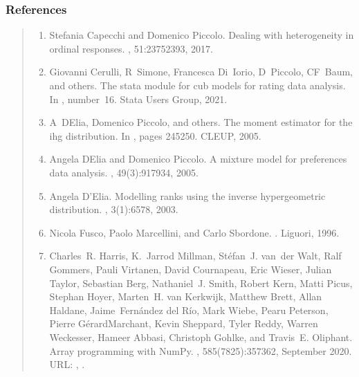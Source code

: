 \documentclass[letterpaper,10pt,english]{sphinxmanual}
\begin{document}
\subsubsection{References}
\label{\detokenize{cubmods:references}}\begin{quote}
\begin{enumerate}
%
\setcounter{enumi}{0}
\item {} 
\sphinxAtStartPar
Stefania Capecchi and Domenico Piccolo. Dealing with heterogeneity in ordinal responses. , 51:2375\textendash{}2393, 2017.

\item {} 
\sphinxAtStartPar
Giovanni Cerulli, R Simone, Francesca Di Iorio, D Piccolo, CF Baum, and others. The stata module for cub models for rating data analysis. In , number 16. Stata Users Group, 2021.

\item {} 
\sphinxAtStartPar
A D\textquotesingle{}Elia, Domenico Piccolo, and others. The moment estimator for the ihg distribution. In , pages 245\textendash{}250. CLEUP, 2005.

\item {} 
\sphinxAtStartPar
Angela D\textquotesingle{}Elia and Domenico Piccolo. A mixture model for preferences data analysis. , 49(3):917\textendash{}934, 2005.

\item {} 
\sphinxAtStartPar
Angela D’Elia. Modelling ranks using the inverse hypergeometric distribution. , 3(1):65\textendash{}78, 2003.

\item {} 
\sphinxAtStartPar
Nicola Fusco, Paolo Marcellini, and Carlo Sbordone. . Liguori, 1996.

\item {} 
\sphinxAtStartPar
Charles R. Harris, K. Jarrod Millman, Stéfan J. van der Walt, Ralf Gommers, Pauli Virtanen, David Cournapeau, Eric Wieser, Julian Taylor, Sebastian Berg, Nathaniel J. Smith, Robert Kern, Matti Picus, Stephan Hoyer, Marten H. van Kerkwijk, Matthew Brett, Allan Haldane, Jaime Fernández del Río, Mark Wiebe, Pearu Peterson, Pierre Gérard\sphinxhyphen{}Marchant, Kevin Sheppard, Tyler Reddy, Warren Weckesser, Hameer Abbasi, Christoph Gohlke, and Travis E. Oliphant. Array programming with NumPy. , 585(7825):357\textendash{}362, September 2020. URL: , .


\end{enumerate}
\end{quote}
\end{document}
